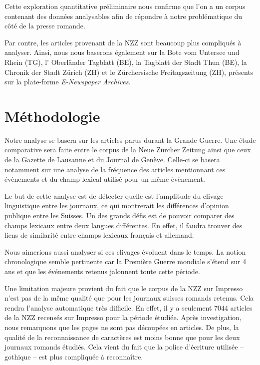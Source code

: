 \documentclass[french,a4paper]{article}
\begin{document}
Cette exploration quantitative préliminaire nous confirme que l'on a un corpus contenant des données analysables afin de répondre à notre problématique du côté de la presse romande.

Par contre, les articles provenant de la NZZ sont beaucoup plus compliqués à analyser.
Ainsi, nous nous baserons également sur la \og Bote vom Untersee und Rhein \fg{} (TG), l' \og Oberländer Tagblatt \fg{} (BE), la \og Tagblatt der Stadt Thun \fg{} (BE), la \og Chronik der Stadt Zürich \fg{} (ZH) et le \og Zürchersische Freitagszeitung \fg{} (ZH), présents sur la plate-forme \textit{E-Newspaper Archives}.


\section*{Méthodologie}

Notre analyse se basera sur les articles parus durant la Grande Guerre.
Une étude comparative sera faite entre le corpus de la Neue Zürcher Zeitung ainsi que ceux de la Gazette de Lausanne et du Journal de Genève.
Celle-ci se basera notamment sur une analyse de la fréquence des articles mentionnant ces évènements et du champ lexical utilisé pour un même évènement.

Le but de cette analyse est de détecter quelle est l'amplitude du clivage linguistique entre les journaux, ce qui montrerait les différences d'opinion publique entre les Suisses.
Un des grands défis est de pouvoir comparer des champs lexicaux entre deux langues différentes.
En effet, il faudra trouver des liens de similarité entre champs lexicaux français et allemand.

Nous aimerions aussi analyser si ces clivages évoluent dans le temps.
La notion chronologique semble pertinente car la Première Guerre mondiale s'étend sur 4 ans et que les événements retenus jalonnent toute cette période.

Une limitation majeure provient du fait que le corpus de la NZZ sur Impresso n'est pas de la même qualité que pour les journaux suisses romands retenus.
Cela rendra l'analyse automatique très difficile.
En effet, il y a seulement 7044 articles de la NZZ recensés sur Impresso pour la période étudiée.
Après investigation, nous remarquons que les pages ne sont pas découpées en articles. De plus, la qualité de la reconnaissance de caractères est moins bonne que pour les deux journaux romands étudiés.
Cela vient du fait que la police d'écriture utilisée -- gothique -- est plus compliquée à reconnaître.
\end{document}
